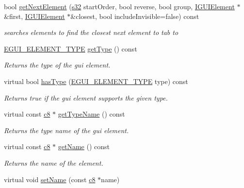 \begin{DoxyCompactItemize}
bool \hyperlink{classirr_1_1gui_1_1IGUIElement_aaf461c857c9005d310635e56dc384ed4}{get\+Next\+Element} (\hyperlink{namespaceirr_ac66849b7a6ed16e30ebede579f9b47c6}{s32} start\+Order, bool reverse, bool group, \hyperlink{classirr_1_1gui_1_1IGUIElement}{I\+G\+U\+I\+Element} $\ast$\&first, \hyperlink{classirr_1_1gui_1_1IGUIElement}{I\+G\+U\+I\+Element} $\ast$\&closest, bool include\+Invisible=false) const
\begin{DoxyCompactList}\small\item\em searches elements to find the closest next element to tab to \end{DoxyCompactList}\item 
\hyperlink{namespaceirr_1_1gui_ae4d66df0ecf4117cdbcf9f22404bd254}{E\+G\+U\+I\+\_\+\+E\+L\+E\+M\+E\+N\+T\+\_\+\+T\+Y\+PE} \hyperlink{classirr_1_1gui_1_1IGUIElement_aeb2f4dec42afc4b8c1182897d0dc1a70}{get\+Type} () const
\begin{DoxyCompactList}\small\item\em Returns the type of the gui element. \end{DoxyCompactList}\item 
virtual bool \hyperlink{classirr_1_1gui_1_1IGUIElement_a3c9f0356f89f4906c7bf5a302e57f01d}{has\+Type} (\hyperlink{namespaceirr_1_1gui_ae4d66df0ecf4117cdbcf9f22404bd254}{E\+G\+U\+I\+\_\+\+E\+L\+E\+M\+E\+N\+T\+\_\+\+T\+Y\+PE} type) const
\begin{DoxyCompactList}\small\item\em Returns true if the gui element supports the given type. \end{DoxyCompactList}\item 
virtual const \hyperlink{namespaceirr_a9395eaea339bcb546b319e9c96bf7410}{c8} $\ast$ \hyperlink{classirr_1_1gui_1_1IGUIElement_a656d2055c0d61382afee1d494c275ce9}{get\+Type\+Name} () const
\begin{DoxyCompactList}\small\item\em Returns the type name of the gui element. \end{DoxyCompactList}\item 
virtual const \hyperlink{namespaceirr_a9395eaea339bcb546b319e9c96bf7410}{c8} $\ast$ \hyperlink{classirr_1_1gui_1_1IGUIElement_a308fa8bc16580d53df5c65ded0c1349b}{get\+Name} () const
\begin{DoxyCompactList}\small\item\em Returns the name of the element. \end{DoxyCompactList}\item 
virtual void \hyperlink{classirr_1_1gui_1_1IGUIElement_a47ce14d1a973137b6cbe91a047df2ebe}{set\+Name} (const \hyperlink{namespaceirr_a9395eaea339bcb546b319e9c96bf7410}{c8} $\ast$name)

\end{DoxyCompactItemize}
